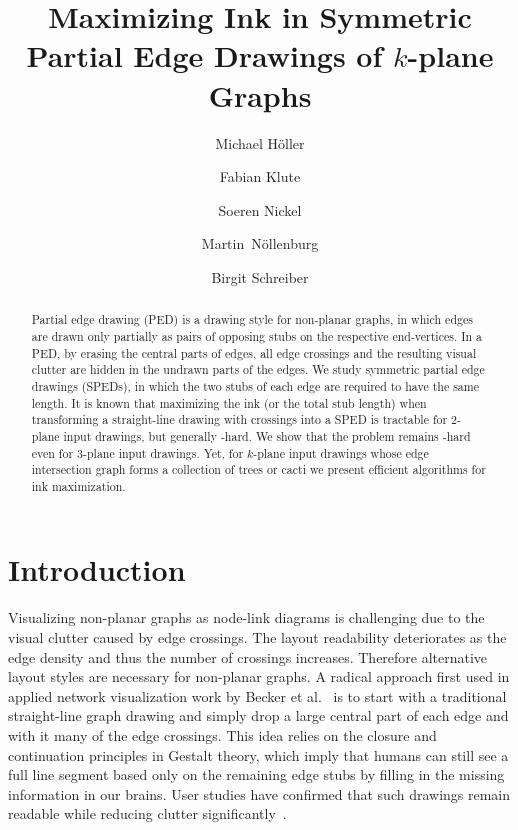 \documentclass[a4paper,english,numberwithinsect]{eurocg18}
\title{Maximizing Ink in Symmetric Partial Edge Drawings of $k$-plane Graphs}
\author[1]{Michael H\"oller}
\author[1]{Fabian Klute}
\author[1]{Soeren Nickel}
\author[1]{Martin~N\"ollenburg}
\author[1]{Birgit Schreiber}
\affil[1]{Algorithms and Complexity Group, TU Wien, Vienna, Austria\\ \texttt{[fklute|noellenburg]@ac.tuwien.ac.at, soeren.nickel@tuwien.ac.at}}
\begin{document}
\maketitle

\begin{abstract}
	Partial edge drawing (PED) is a drawing style for non-planar graphs, in which edges are drawn only partially as pairs of opposing stubs on the respective end-vertices. 
	In a PED, by erasing the central parts of edges, all edge crossings and the resulting visual clutter are hidden in the undrawn parts of the edges.
	We study symmetric partial edge drawings (SPEDs), in which the two stubs of each edge are required to have the same length. 
	It is known that maximizing the ink (or the total stub length) when transforming a straight-line drawing with crossings into a SPED is tractable for 2-plane input drawings, but generally \NP-hard.
	We show that the problem remains \NP-hard even for 3-plane input drawings.
	Yet, for $k$-plane input drawings whose edge intersection graph forms a collection of trees or cacti we present efficient algorithms for ink maximization.
\end{abstract}

\section{Introduction}

Visualizing non-planar graphs as node-link diagrams is challenging due to the visual clutter caused by edge crossings. The layout readability deteriorates as the edge density and thus the number of crossings increases.
Therefore alternative layout styles are necessary for non-planar graphs.
A radical approach first used in applied network visualization work by Becker et al.~\cite{bew-vnd-95} is to start with a traditional straight-line graph drawing and simply drop a large central part of each edge and with it many of the edge crossings.
This idea relies on the closure and continuation principles in Gestalt theory, which imply that humans can still see a full line segment based only on the remaining edge stubs by filling in the missing information in our brains.
User studies have confirmed that such drawings remain readable while reducing clutter significantly~\cite{bvkw-epdldge-12,bkl-us-15}.
\end{document}
